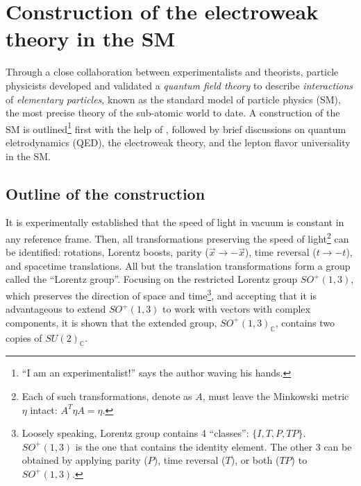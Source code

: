 \section{Construction of the electroweak theory in the SM}

Through a close collaboration between experimentalists and theorists,
particle physicists developed and validated a \emph{quantum field theory}
to describe \emph{interactions} of \emph{elementary particles},
known as the standard model of particle physics (SM),
the most precise theory of the sub-atomic world to date.
A construction of the SM is outlined\footnote{
    ``I am an experimentalist!'' says the author waving his hands.
} first with the help of
\cite{Robinson_2011,Schwichtenberg_2018},
followed by brief discussions on quantum eletrodynamics (QED),
the electroweak theory, and the lepton flavor universality in the SM.


\subsection{Outline of the construction}

It is experimentally established that the speed of light in vacuum is constant
in any reference frame.
Then, all transformations preserving the speed of light\footnote{
    Each of such transformations, denote as $A$, must leave the Minkowski metric
    $\eta$ intact: $A^T \eta A = \eta$.
} can be identified:
rotations, Lorentz boosts, parity ($\vec{x} \rightarrow -\vec{x}$),
time reversal ($t \rightarrow -t$), and spacetime translations.
All but the translation transformations form a group called the
``Lorentz group''.
Focusing on the restricted Lorentz group $SO^+(1, 3)$,
which preserves the direction of space and time\footnote{
    Loosely speaking, Lorentz group contains 4 ``classes'': $\{I, T, P, TP\}$.
    $SO^+(1,3)$ is the one that contains the identity element.
    The other 3 can be obtained by applying parity ($P$), time reversal ($T$),
    or both ($TP$) to $SO^+(1,3)$.
},
and accepting that it is advantageous to extend $SO^+(1,3)$ to work with vectors
with complex components,
it is shown that the extended group, $SO^+(1,3)_\mathbb{C}$,
contains two copies of $SU(2)_\mathbb{C}$.

